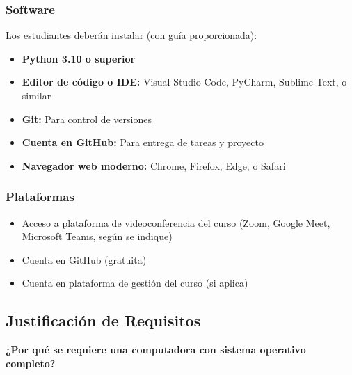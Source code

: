 \documentclass[12pt,letterpaper]{article}
\begin{document}
\subsubsection{Software}

Los estudiantes deberán instalar (con guía proporcionada):
\begin{itemize}[leftmargin=*]
    \item \textbf{Python 3.10 o superior}
    \item \textbf{Editor de código o IDE:} Visual Studio Code, PyCharm, Sublime Text, o similar
    \item \textbf{Git:} Para control de versiones
    \item \textbf{Cuenta en GitHub:} Para entrega de tareas y proyecto
    \item \textbf{Navegador web moderno:} Chrome, Firefox, Edge, o Safari
\end{itemize}

\subsubsection{Plataformas}
\begin{itemize}[leftmargin=*]
    \item Acceso a plataforma de videoconferencia del curso (Zoom, Google Meet, Microsoft Teams, según se indique)
    \item Cuenta en GitHub (gratuita)
    \item Cuenta en plataforma de gestión del curso (si aplica)
\end{itemize}

\subsection{Justificación de Requisitos}

\textbf{¿Por qué se requiere una computadora con sistema operativo completo?}
\end{document}
